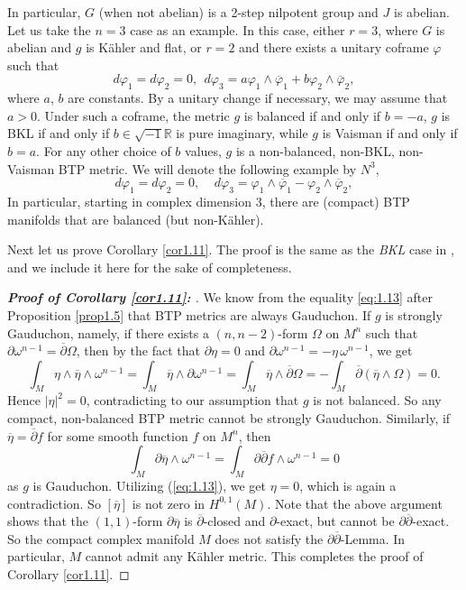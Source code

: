 \documentclass{amsart}
\numberwithin{equation}{section}
\theoremstyle{definition}
\renewcommand{\1}{\mathds{1}}
\renewcommand{\>}{\rightarrow}
\begin{document}
In particular, $G$  (when not abelian) is a 2-step nilpotent group and $J$ is abelian.
Let us take the $n=3$ case as an example. In this case, either $r=3$, where $G$ is abelian and $g$ is K\"ahler and flat,
or $r=2$ and there exists a unitary coframe $\varphi$ such that
$$ d\varphi_1=d\varphi_2=0, \ \ d\varphi_3 = a\varphi_1\wedge \overline{\varphi}_1 + b \varphi_2\wedge \overline{\varphi}_2, $$
where $a$, $b$ are constants. By a unitary change if necessary, we may assume that $a>0$. Under such a coframe, the metric $g$ is balanced if and only if $b=-a$,
$g$ is BKL if and only if $b\in \sqrt{-1}{\mathbb R}$ is pure imaginary,
while $g$ is Vaisman if and only if $b=a$.
For any other choice of $b$ values, $g$ is a non-balanced, non-BKL, non-Vaisman BTP metric. We will denote the following example by $N^3$,
\begin{equation}     \label{N_3}
d\varphi_1=d\varphi_2=0, \ \ \ \ \ d\varphi_3 = \varphi_1 \wedge \overline{\varphi}_1 - \varphi_2 \wedge \overline{\varphi}_2,
\end{equation}
In particular, starting in complex dimension $3$, there are (compact) BTP manifolds that are balanced (but non-K\"ahler).

Next let us prove Corollary \ref{cor1.11}. The proof is the same as the {\em BKL} case in \cite{ZhaoZ19Str}, and we include it here for the sake of completeness.


\begin{proof}[{\bf Proof of Corollary \ref{cor1.11}: }]
We know from the equality \eqref{eq:1.13} after Proposition \ref{prop1.5} that BTP metrics are always Gauduchon.
If $g$ is strongly Gauduchon, namely, if there exists a $(n,n-2)$-form $\Omega$ on $M^n$ such that $\partial \omega^{n-1}=\overline{\partial }\Omega$, then by the fact that $\partial \eta =0$ and $\partial \omega^{n-1}=-\eta \, \omega^{n-1}$, we get
\[ \int_M \eta \wedge \overline{\eta} \wedge \omega^{n-1} = \int_M \overline{\eta} \wedge \partial  \omega^{n-1} = \int_M \overline{\eta} \wedge \overline{\partial }\Omega = - \int_M \overline{\partial } (\overline{\eta} \wedge \Omega )= 0.\]
Hence $|\eta|^2 = 0$, contradicting to our assumption that $g$ is not balanced. So any compact, non-balanced BTP metric cannot be strongly Gauduchon. Similarly, if $\overline{\eta} = \overline{\partial }f$ for some smooth function $f$ on $M^n$, then
$$ \int_M \partial \overline{\eta} \wedge \omega^{n-1} = \int_M \partial \overline{\partial }f \wedge \omega^{n-1} =0$$
as $g$ is Gauduchon. Utilizing (\ref{eq:1.13}), we get $\eta =0$, which is again a contradiction. So $[\overline{\eta}]$ is not zero in $H^{0,1}(M)$.
Note that the above argument shows that the $(1,1)$-form $\partial \overline{\eta}$ is $\overline{\partial}$-closed and $\partial$-exact,
but cannot be $\partial \overline{\partial}$-exact. So the compact complex manifold $M$ does not satisfy the $\partial \overline{\partial}$-Lemma.
In particular, $M$ cannot admit any K\"ahler metric. This completes the proof of Corollary \ref{cor1.11}. \end{proof}
\end{document}
